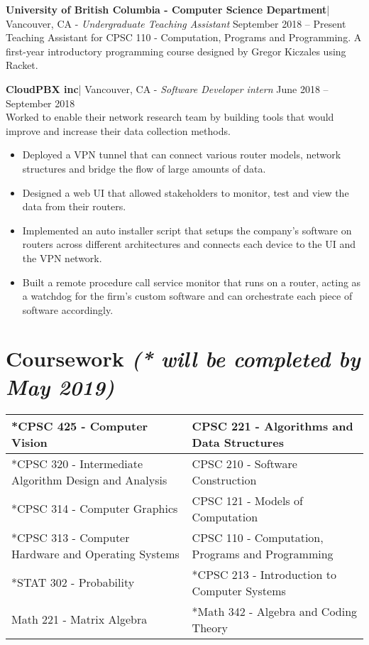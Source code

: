 \documentclass[letter]{res}
\begin{document}
\begin{resume}
\textbf{University of British Columbia - Computer Science Department}| Vancouver, CA \newline 
 - {\sl Undergraduate Teaching Assistant} \hfill September 2018 – Present\\
 Teaching Assistant for CPSC 110 - Computation, Programs and Programming. A first-year introductory programming course designed by Gregor Kiczales using Racket.

\textbf{CloudPBX inc}| Vancouver, CA \newline 
 - {\sl Software Developer intern} \hfill June 2018 – September 2018\\
Worked to enable their network research team by building tools that would improve and increase their data collection methods. \\
 \vspace{-2mm}
 \begin{itemize}
 \item Deployed a VPN tunnel that can connect various router models, network structures and bridge the flow of large amounts of data.
 \item Designed a web UI that allowed stakeholders to monitor, test and view the data from their routers.
 \item Implemented an auto installer script that setups the company's software on routers across different architectures and connects each device to the UI and the VPN network.
 \item Built a remote procedure call service monitor that runs on a router, acting as a watchdog for the firm's custom software and can orchestrate each piece of software accordingly.
 \end{itemize}

\section{Coursework {\sl(* will be completed by May 2019) }} \hfill
\vspace{-2mm}
\begin{tabu} { | X[l] | X[l] |}
 \hline
 *CPSC 425 - Computer Vision & CPSC 221 - Algorithms and Data Structures \\
 \hline
 *CPSC 320 - Intermediate Algorithm Design and Analysis  & CPSC 210 - Software Construction  \\
 \hline
 *CPSC 314 - Computer Graphics & CPSC 121 - Models of Computation \\
 \hline
 *CPSC 313 - Computer Hardware and Operating Systems & CPSC 110 - Computation, Programs and Programming \\
   \hline
 *STAT 302 - Probability & *CPSC 213 - Introduction to Computer Systems \\
  \hline
 Math 221 - Matrix Algebra & *Math 342 - Algebra and Coding Theory \\
\hline
\end{tabu}
 \vspace{-2mm}

\end{resume}
\end{document}
